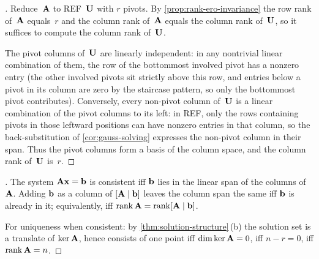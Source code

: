 \begin{proof}[]
Reduce~$\mathbf{A}$ to REF~$\mathbf{U}$ with $r$ pivots. By
\cref{prop:rank-ero-invariance} the row rank of~$\mathbf{A}$ equals~$r$ and
the column rank of~$\mathbf{A}$ equals the column rank of~$\mathbf{U}$, so
it suffices to compute the column rank of~$\mathbf{U}$.

The pivot columns of~$\mathbf{U}$ are linearly independent: in any
nontrivial linear combination of them, the row of the bottommost
involved pivot has a nonzero entry (the other involved pivots sit
strictly above this row, and entries below a pivot in its column are
zero by the staircase pattern, so only the bottommost pivot contributes). Conversely, every non-pivot
column of~$\mathbf{U}$ is a linear combination of the pivot columns to
its left: in REF, only the rows containing pivots in those leftward
positions can have nonzero entries in that column, so the back-substitution
of \cref{cor:gauss-solving} expresses the non-pivot column in their
span. Thus the pivot columns form a basis of the column space, and the
column rank of~$\mathbf{U}$ is~$r$.
\end{proof}

\begin{proof}[]
The system $\mathbf{A}\mathbf{x} = \mathbf{b}$ is consistent iff $\mathbf{b}$
lies in the linear span of the columns of~$\mathbf{A}$. Adding $\mathbf{b}$
as a column of $[\mathbf{A} \mid \mathbf{b}]$ leaves the column span the
same iff $\mathbf{b}$ is already in it; equivalently, iff
$\operatorname{rank} \mathbf{A} = \operatorname{rank} [\mathbf{A} \mid \mathbf{b}]$.

For uniqueness when consistent: by
\cref{thm:solution-structure}\,(b) the solution set is a translate of
$\ker \mathbf{A}$, hence consists of one point iff
$\dim \ker \mathbf{A} = 0$, iff $n - r = 0$, iff $\operatorname{rank} \mathbf{A} = n$.
\end{proof}


